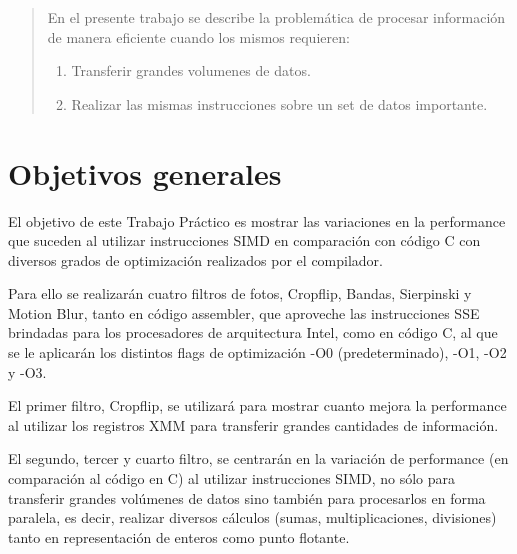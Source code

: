\documentclass[a4paper]{article}
\begin{document}
\thispagestyle{empty}

\maketitle
\newpage

\thispagestyle{empty}
\vfill
\begin{abstract}
En el presente trabajo se describe la problemática de procesar información de manera eficiente cuando los mismos requieren:
\begin{enumerate}
\item Transferir grandes volumenes de datos.
\item Realizar las mismas instrucciones sobre un set de datos importante.
\end{enumerate}

\end{abstract}

\thispagestyle{empty}
\vspace{3cm}
\tableofcontents
\newpage

\newpage

\section{Objetivos generales}

El objetivo de este Trabajo Práctico es mostrar las variaciones en la performance que suceden al utilizar instrucciones SIMD en comparación con código C con diversos grados de optimización realizados por el compilador.

Para ello se realizarán cuatro filtros de fotos, Cropflip, Bandas, Sierpinski y Motion Blur, tanto en código assembler, que aproveche las instrucciones SSE brindadas para los procesadores de arquitectura Intel, como en código C, al que se le aplicarán los distintos flags de optimización -O0 (predeterminado), -O1, -O2 y -O3.

El primer filtro, Cropflip, se utilizará para mostrar cuanto mejora la performance al utilizar los registros XMM para transferir grandes cantidades de información.

El segundo, tercer y cuarto filtro, se centrarán en la variación de performance (en comparación al código en C) al utilizar instrucciones SIMD, no sólo para transferir grandes volúmenes de datos sino también para procesarlos en forma paralela, es decir, realizar diversos cálculos (sumas, multiplicaciones, divisiones) tanto en representación de enteros como punto flotante.
\end{document}
